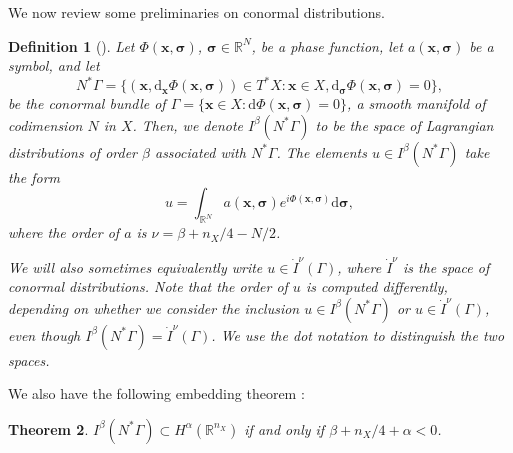 \documentclass[11pt]{article}
\newcommand{\be}{\begin{equation}}
\newcommand{\ee}{\end{equation}}
\newcommand{\q}{\nu}
\newcommand{\br}{\mathbb{R}}
\newcommand{\bt}{\beta}
\newcommand{\al}{\alpha}
\newcommand{\dd}{\mathrm{d}}
\numberwithin{equation}{section}
\newcommand{\vx}{\mathbf{x}}
\newcommand{\vsig}{{\boldsymbol{\sigma}}}
\newtheorem{theorem}{Theorem}[section]
\newtheorem{definition}[theorem]{Definition}
\theoremstyle{definition}
\begin{document}
\noindent We now review some preliminaries on conormal distributions.
\begin{definition}[\cite{palacios2018quantitative,greenleaf1993recovering}]
\label{def_conormal}
Let $\Phi(\vx,\vsig)$, $\vsig\in\br^N$, be a phase function, let $a(\vx,\vsig)$ be a symbol, and let 
\be
N^*\Gamma = \{(\vx, \mathrm{d}_\vx\Phi(\vx,\vsig)) \in T^* X : \vx \in X, \mathrm{d}_\vsig\Phi(\vx,\vsig) = 0\},
\ee
be the conormal bundle of $\Gamma=\{\vx\in X:\dd \Phi(\vx,\vsig)=0\}$, a smooth manifold of codimension $N$ in $X$. Then, we denote $I^\beta(N^*\Gamma) $ to be the space of Lagrangian distributions of order $\beta$ associated with $N^*\Gamma$. The elements $u \in I^\beta(N^*\Gamma)$  take the form
\be
u = \int_{\br^N}a(\vx,\vsig) e^{i \Phi(\vx,\vsig)} \mathrm{d}\vsig,
\ee
where the order of $a$ is $\q = \beta + n_X/4 -N/2$. 

We will also sometimes equivalently write $u\in  \dot{I}^{\q}(\Gamma)$, where $\dot{I}^{\q}$ is the space of conormal distributions. Note that the order of $u$ is computed differently, depending on whether we consider the inclusion $u \in I^\beta(N^*\Gamma)$ or $u \in \dot{I}^\q(\Gamma)$, even though $I^\beta(N^*\Gamma)=\dot{I}^\q(\Gamma)$. We use the dot notation to distinguish the two spaces.
\end{definition}

We also have the following embedding theorem \cite[Theorem 5.4.1]{dusthorII_72}:
\begin{theorem}\label{thm:embedding}
$I^\beta(N^*\Gamma)\subset H^{\alpha}(\br^{n_X})$ if and only if $\bt+n_X/4+\al < 0$.
\end{theorem}
\end{document}

